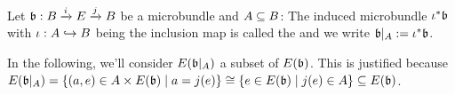  \\
Let $\bb: \bundle{B}{E}{i}{j}$ be a microbundle and $A \sub B$:
The induced microbundle $\iota^*\bb$ with $\iota: A \incl B$ being the inclusion map is called the  and
we write $\bb \restrict{A} := \iota^*\bb$.
\begin{remark}
In the following, we'll consider $E(\bb\restrict{A})$ a subset of $E(\bb)$.
This is justified because
$E(\bb\restrict{A}) = \{ (a, e) \in A \times E(\bb) \mid a = j(e) \} \cong \{ e \in E(\bb) \mid j(e) \in A \} \sub E(\bb)$.
\end{remark}
